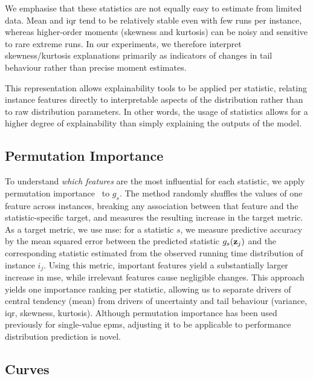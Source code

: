 We emphasise that these statistics are not equally easy to estimate from limited data. Mean and \gls{iqr} tend to be relatively stable even with few runs per instance, whereas higher-order moments (skewness and kurtosis) can be noisy and sensitive to rare extreme runs. In our experiments, we therefore interpret skewness/kurtosis explanations primarily as indicators of changes in tail behaviour rather than precise moment estimates.

This representation allows explainability tools to be applied per statistic, relating instance features directly to interpretable aspects of the distribution rather than to raw distribution parameters.
In other words, the usage of statistics allows for a higher degree of explainability than simply explaining the outputs of the model.

\subsection{Permutation Importance}
\label{sec:ch09:perm_importance}

To understand \emph{which features} are the most influential for each statistic, we apply permutation importance~\citep{Breiman01} to $g_s$.
The method randomly shuffles the values of one feature across instances, breaking any association between that feature and the statistic-specific target, and measures the resulting increase in the target metric.
As a target metric, we use \gls{mse}: for a statistic $s$, we measure predictive accuracy by the mean squared error between the predicted statistic $g_s(\mathbf{z}_j)$ and the corresponding statistic estimated from the observed running time distribution of instance $i_j$.
Using this metric, important features yield a substantially larger increase in \gls{mse}, while irrelevant features cause negligible changes.
This approach yields one importance ranking per statistic, allowing us to separate drivers of central tendency (mean) from drivers of uncertainty and tail behaviour (variance, \gls{iqr}, skewness, kurtosis).
Although permutation importance has been used previously for single-value \glspl{epm}, adjusting it to be applicable to performance distribution prediction is novel.

\subsection{ Curves}
\label{sec:ch09:ice_plots}

